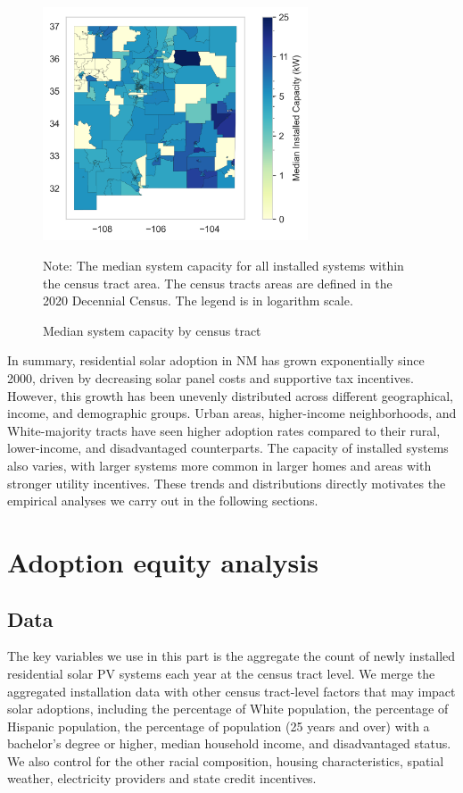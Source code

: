 \documentclass[12pt,twoside,letterpaper]{article}
\begin{document}
\begin{figure}[!ht]
    \centering
\includegraphics[width=0.7\textwidth]{figures/tract_median_capacity_map.png}
    \caption{Median system capacity by census tract}
    \label{fig:median_cap_map}
        \begin{flushleft}
        \footnotesize Note: The median system capacity for all installed systems within the census tract area. The census tracts areas are defined in the 2020 Decennial Census. The legend is in logarithm scale. 
    \end{flushleft}
\end{figure}


In summary, residential solar adoption in NM has grown exponentially since 2000, driven by decreasing solar panel costs and supportive tax incentives. However, this growth has been unevenly distributed across different geographical, income, and demographic groups. Urban areas, higher-income neighborhoods, and White-majority tracts have seen higher adoption rates compared to their rural, lower-income, and disadvantaged counterparts. The capacity of installed systems also varies, with larger systems more common in larger homes and areas with stronger utility incentives. These trends and distributions directly motivates the empirical analyses we carry out in the following sections.


\section{Adoption equity analysis}

\subsection{Data}
The key variables we use in this part is the aggregate the count of newly installed residential solar PV systems each year at the census tract level. We merge the aggregated installation data with other census tract-level factors that may impact solar adoptions, including the percentage of White population, the percentage of Hispanic population, the percentage of population (25 years and over) with a bachelor’s degree or higher, median household income, and disadvantaged status. We also control for the other racial composition, housing characteristics, spatial weather, electricity providers and state credit incentives.
\end{document}
